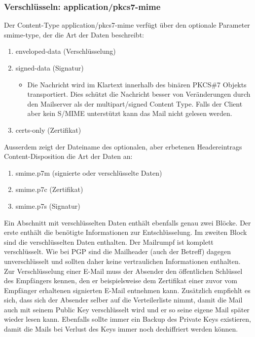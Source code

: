 \subsubsection{Verschlüsseln: application/pkcs7-mime}
Der Content-Type application/pkcs7-mime verfügt über den optionale Parameter smime-type, der die Art der Daten beschreibt:
\begin{enumerate}
	\item enveloped-data (Verschlüsselung)
	\item signed-data (Signatur)
	\begin{itemize}
		\item Die Nachricht wird im Klartext innerhalb des binären PKCS\#7 Objekts transportiert. Dies schützt die Nachricht besser von Veränderungen durch den Mailserver als der multipart/signed Content Type. Falls der Client aber kein S/MIME unterstützt kann das Mail nicht gelesen werden.
	\end{itemize}
	\item certs-only (Zertifikat)
\end{enumerate}
Ausserdem zeigt der Dateiname des optionalen, aber erbetenen Headereintrags Content-Disposition die Art der Daten an:
\begin{enumerate}
	\item smime.p7m (signierte oder verschlüsselte Daten)
	\item smime.p7c (Zertifikat)
	\item smime.p7s (Signatur)
\end{enumerate}
Ein Abschnitt mit verschlüsselten Daten enthält ebenfalls genau zwei Blöcke. Der erste enthält die benötigte Informationen zur Entschlüsselung. Im zweiten Block sind die verschlüsselten Daten enthalten. Der Mailrumpf ist komplett verschlüsselt. Wie bei PGP sind die Mailheader (auch der Betreff) dagegen unverschlüsselt und sollten daher keine vertraulichen Informationen enthalten. Zur Verschlüsselung einer E-Mail muss der Absender den öffentlichen Schlüssel des Empfängers kennen, den er beispielsweise dem Zertifikat einer zuvor vom Empfänger erhaltenen signierten E-Mail entnehmen kann. Zusätzlich empfiehlt es sich, dass sich der Absender selber auf die Verteilerliste nimmt, damit die Mail auch mit seinem Public Key verschlüsselt wird und er so seine eigene Mail später wieder lesen kann. Ebenfalls sollte immer ein Backup des Private Keys existieren, damit die Mails bei Verlust des Keys immer noch dechiffriert werden können.
